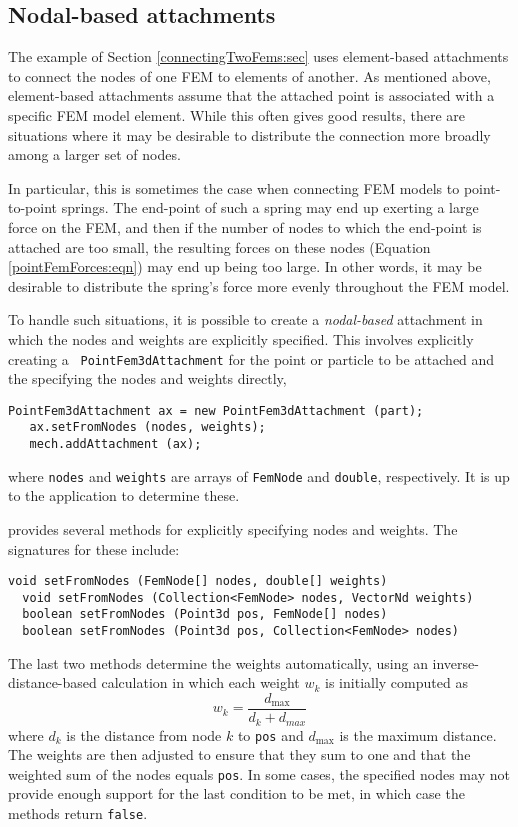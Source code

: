 \subsection{Nodal-based attachments}
\label{sec:fem:nodalAttachments}

The example of Section \ref{connectingTwoFems:sec} uses element-based
attachments to connect the nodes of one FEM to elements of another.
As mentioned above, element-based attachments assume that the attached
point is associated with a specific FEM model element. 
While this often gives good results, there are situations where it may
be desirable to distribute the connection more broadly among a larger
set of nodes. 

In particular, this is sometimes the case when connecting FEM models
to point-to-point springs. The end-point of such a spring may end up
exerting a large force on the FEM, and then if the number of nodes to
which the end-point is attached are too small, the resulting forces on
these nodes (Equation \ref{pointFemForces:eqn}) may end up being too
large. In other words, it may be desirable to distribute the spring's
force more evenly throughout the FEM model. 

To handle such situations, it is possible to create a {\it
nodal-based} attachment in which the nodes and weights are explicitly
specified. This involves explicitly creating a {\tt
PointFem3dAttachment} for the point or particle to be attached and the
specifying the nodes and weights directly,
%
\begin{lstlisting}[]
   PointFem3dAttachment ax = new PointFem3dAttachment (part);
   ax.setFromNodes (nodes, weights);
   mech.addAttachment (ax);
\end{lstlisting}
%
where {\tt nodes} and {\tt weights} are arrays of {\tt FemNode} and
{\tt double}, respectively. It is up to the application to determine
these.

 provides
several methods for explicitly specifying nodes and weights. The
signatures for these include:
\begin{lstlisting}[]
  void setFromNodes (FemNode[] nodes, double[] weights)
  void setFromNodes (Collection<FemNode> nodes, VectorNd weights)
  boolean setFromNodes (Point3d pos, FemNode[] nodes)
  boolean setFromNodes (Point3d pos, Collection<FemNode> nodes)
\end{lstlisting}
The last two methods determine the weights automatically, using an
inverse-distance-based calculation in which each weight $w_k$
is initially computed as
%
\begin{equation}
w_k = \frac{d_{\text{max}}}{d_k + d_{max}}
\label{invDistWeights:eqn}
\end{equation}
%
where $d_k$ is the distance from node $k$ to {\tt pos} and
$d_{\text{max}}$ is the maximum distance. The weights are then
adjusted to ensure that they sum to one and that the weighted sum of
the nodes equals {\tt pos}. In some cases, the specified nodes
may not provide enough support for the last condition to be
met, in which case the methods return {\tt false}.

